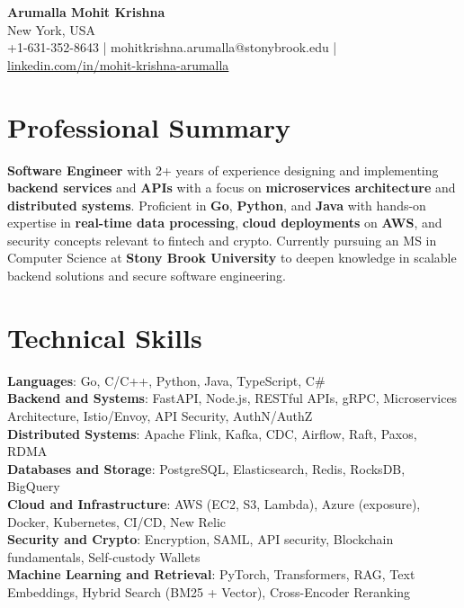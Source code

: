 \documentclass[letterpaper,11pt]{article}
\begin{document}
\begin{center}
  {\Large \textbf{Arumalla Mohit Krishna}} \\
  New York, USA \\
  +1-631-352-8643 \enspace | \enspace mohitkrishna.arumalla@stonybrook.edu \enspace | \enspace \href{https://www.linkedin.com/in/mohit-krishna-arumalla}{linkedin.com/in/mohit-krishna-arumalla}
\end{center}

\section{Professional Summary}
  \begin{itemize}[leftmargin=0.15in, label={}]
    \small{\item{
     \textbf{Software Engineer} with 2+ years of experience designing and implementing \textbf{backend services} and \textbf{APIs} with a focus on \textbf{microservices architecture} and \textbf{distributed systems}. Proficient in \textbf{Go}, \textbf{Python}, and \textbf{Java} with hands-on expertise in \textbf{real-time data processing}, \textbf{cloud deployments} on \textbf{AWS}, and security concepts relevant to fintech and crypto. Currently pursuing an MS in Computer Science at \textbf{Stony Brook University} to deepen knowledge in scalable backend solutions and secure software engineering.
    }}
  \end{itemize}
\vspace{-16pt}

\section{Technical Skills}
 \begin{itemize}[leftmargin=0.15in, label={}]
    \small{\item{
     \textbf{Languages}: Go, C/C++, Python, Java, TypeScript, C\# \\
     \textbf{Backend and Systems}: FastAPI, Node.js, RESTful APIs, gRPC, Microservices Architecture, Istio/Envoy, API Security, AuthN/AuthZ \\
     \textbf{Distributed Systems}: Apache Flink, Kafka, CDC, Airflow, Raft, Paxos, RDMA \\
     \textbf{Databases and Storage}: PostgreSQL, Elasticsearch, Redis, RocksDB, BigQuery \\
     \textbf{Cloud and Infrastructure}: AWS (EC2, S3, Lambda), Azure (exposure), Docker, Kubernetes, CI/CD, New Relic \\
     \textbf{Security and Crypto}: Encryption, SAML, API security, Blockchain fundamentals, Self-custody Wallets \\
     \textbf{Machine Learning and Retrieval}: PyTorch, Transformers, RAG, Text Embeddings, Hybrid Search (BM25 + Vector), Cross-Encoder Reranking
    }}
 \end{itemize}
\vspace{-16pt}
\end{document}
